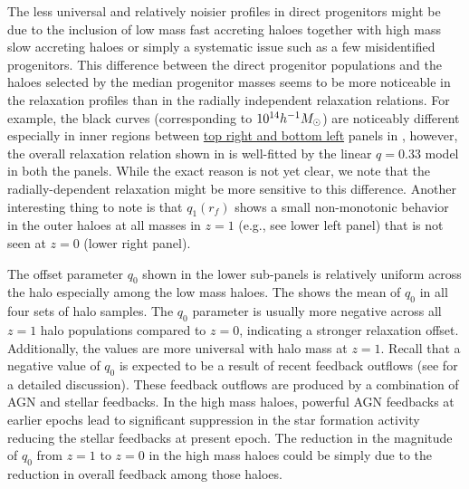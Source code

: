 The less universal and relatively noisier profiles in direct progenitors might be due to the inclusion of low mass fast accreting haloes together with high mass slow accreting haloes or simply a systematic issue such as a few misidentified progenitors. This difference between the direct progenitor populations and the haloes selected by the median progenitor masses seems to be more noticeable in the relaxation profiles than in the radially independent relaxation relations. For example, the black curves (corresponding to $10^{14} h^{-1}M_{\odot}$) are noticeably different especially in inner regions between \underline{top right and bottom left} panels in , however, the overall relaxation relation shown in  is well-fitted by the linear $q=0.33$ model in both the panels. 
While the exact reason is not yet clear, we note that the radially-dependent relaxation might be more sensitive to this difference. 
Another interesting thing to note is that $q_1(r_f)$ shows a small non-monotonic behavior in the outer haloes at all masses in $z=1$ (e.g., see lower left panel) that is not seen at $z=0$ (lower right panel).
 

The offset parameter $q_0$ shown in the lower sub-panels is relatively uniform across the halo especially among the low mass haloes. The  shows the mean of $q_0$ in all four sets of halo samples. The $q_0$ parameter is usually more negative across all $z=1$ halo populations compared to $z=0$, indicating a stronger relaxation offset. Additionally, the values are more universal with halo mass at $z=1$. Recall that a negative value of $q_0$ is expected to be a result of recent feedback outflows (see  for a detailed discussion). These feedback outflows are produced by a combination of AGN and stellar feedbacks. In the high mass haloes, powerful AGN feedbacks at earlier epochs lead to significant suppression in the star formation activity reducing the stellar feedbacks at present epoch. The reduction in the magnitude of $q_0$ from $z=1$ to $z=0$ in the high mass haloes could be simply due to the reduction in overall feedback among those haloes.
~



